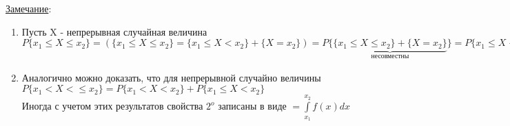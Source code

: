 \underline{Замечание}:
\begin{enumerate}
	\item[1)]
	Пусть X - непрерывная случайная величина \\
	$P\{x_1 \leqslant X \leqslant x_2\} = \left( \{x_1 \leqslant X \leqslant x_2\} = \{x_1 \leqslant X < x_2\} + \{X = x_2\} \right) = P\{\underbrace{\{x_1 \leqslant X \leqslant x_2\} + \{X = x_2\}}_{\text{несовместны}}\} = P\{x_1 \leqslant X < x_2\} + \underbrace{P\{X = x_2\}}_{0 \text{т.к. X - непрерывна}} = P\{x_1 \leqslant X < x_2\}$
	
	\item[2)]
	Аналогично можно доказать, что для непрерывной случайно величины $P\{x_1 < X < \leqslant x_2\} = P\{x_1 < X < x_2\} + P\{x_1 \leqslant X < x_2\}$ \\
	Иногда с учетом этих результатов свойства $2^o$ записаны в виде %
	$ = \int\limits_{x_1}^{x_2} f(x) dx$
\end{enumerate}




















